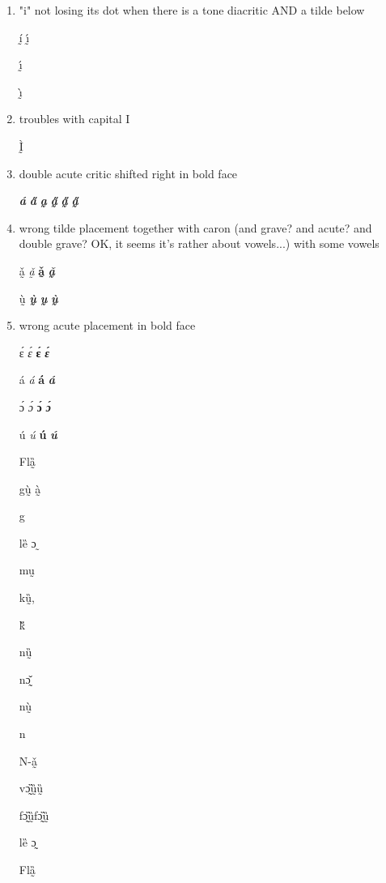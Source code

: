 \begin{enumerate}
  \item  "i" not losing its dot when there is a tone diacritic AND a tilde below

   ḭ́
   ı̰́

   ı̰́

   ı̰̀

  \item troubles with capital I

Ḭ̀

\item double acute critic shifted right in bold face

\textbf{\textit{á}}
\textbf{\textit{a̋}}
\textbf{\textit{a̰}}
\textbf{\textit{\H{a̰}}}
\textbf{\textit{a̰̋}}
\textbf{\textit{a̰̋}}

\item wrong tilde placement together with caron (and grave? and acute? and double grave? OK, it seems it's rather about vowels...) with some vowels

ǎ̰
\textit{ǎ̰}
\textbf{ǎ̰}
\textit{\textbf{ǎ̰}}

ṵ̀
\textbf{\textit{ṵ̀}}
\textbf{\textit{ṵ}}
\textbf{\textit{ṵ̀}}
\item wrong acute placement in bold face

ɛ́
\textit{ɛ́}
\textbf{ɛ́}
\textit{\textbf{ɛ́}}

á
\textit{á}
\textbf{á}
\textit{\textbf{á}}

ɔ́
\textit{ɔ́}
\textbf{ɔ́}
\textit{\textbf{ɔ́}}

ú
\textit{ú}
\textbf{ú}
\textit{\textbf{ú}}

{
\itshape

Flȁ̰


gṵ̀ à̰

g{\ù}{\à}


 lȅ ɔ ̰

mṵ

kṵ̏,

k{\ȕ}

nṵ̏

nɔ̰̌

 nṵ̀

 n{\ù}

 N-ǎ̰

 vɔ̰̏ṵ̏ṵ̏

 fɔ̰̏ṵ̏fɔ̰̏ṵ̏

 lȅ ɔ̰

 }


{
\itshape\bfseries


Flȁ̰


}
\end{enumerate}
